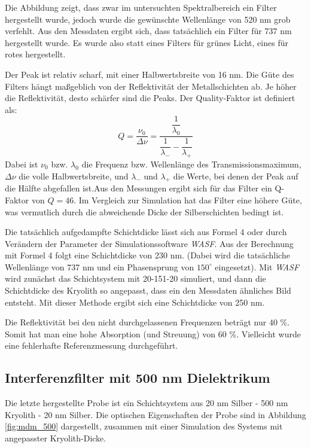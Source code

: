 \documentclass[10pt,twoside]{article}
\renewcommand{\1}{^{-1}}
\renewcommand{\2}{^{-2}}
\newcommand{\3}{^{-3}}
\newcommand{\4}{^{-4}}
\newcommand{\5}{^{-5}}
\newcommand{\6}{^{-6}}
\newcommand{\7}{^{-7}}
\newcommand{\8}{^{-8}}
\newcommand{\9}{^{-9}}
\begin{document}
\newpage

Die Abbildung zeigt, dass zwar im untersuchten Spektralbereich ein Filter hergestellt wurde, jedoch wurde die gewünschte Wellenlänge von 520 nm grob verfehlt. 
Aus den Messdaten ergibt sich, dass tatsächlich ein Filter für 737 nm hergestellt wurde. Es wurde also statt eines Filters für grünes Licht, eines für rotes hergestellt.

Der Peak ist relativ scharf, mit einer Halbwertsbreite von 16 nm. Die Güte des Filters hängt maßgeblich von der Reflektivität der Metallschichten ab. Je höher die Reflektivität, desto schärfer sind die Peaks.
Der Quality-Faktor ist definiert als:
\begin{equation}
Q=\frac{\nu_0}{\Delta \nu} = \dfrac{\dfrac{1}{\lambda_0}}{\dfrac{1}{\lambda_{-}}-\dfrac{1}{\lambda_{+}}}
\end{equation}
Dabei ist $\nu_0$ bzw. $\lambda_0$ die Frequenz bzw. Wellenlänge des Transmissionsmaximum, $\Delta \nu$ die volle Halbwertsbreite, und  $\lambda_{-}$ und $\lambda_{+}$ die Werte, bei denen der Peak auf die Hälfte abgefallen ist.Aus den Messungen ergibt sich für das Filter ein Q-Faktor von $Q=46$.
Im Vergleich zur Simulation hat das Filter eine höhere Güte, was vermutlich durch die abweichende Dicke der Silberschichten bedingt ist.

Die tatsächlich aufgedampfte Schichtdicke lässt sich aus Formel 4 oder durch Verändern der Parameter der Simulationssoftware \textit{WASF}.
Aus der Berechnung mit Formel 4 folgt eine Schichtdicke von 230 nm. (Dabei wird die tatsächliche Wellenlänge von 737 nm und ein Phasensprung von $150^\circ$ eingesetzt).
Mit \textit{WASF} wird zunächst das Schichtsystem mit 20-151-20 simuliert, und dann die Schichtdicke des Kryolith so angepasst, dass ein den Messdaten ähnliches Bild entsteht. Mit dieser Methode ergibt sich eine Schichtdicke von 250 nm.

Die Reflektivität bei den nicht durchgelassenen Frequenzen beträgt nur 40 \%. Somit hat man eine hohe Absorption (und Streuung) von 60 \%. Vielleicht wurde eine fehlerhafte Referenzmessung durchgeführt.


\subsection{Interferenzfilter mit 500 nm Dielektrikum}

Die letzte hergestellte Probe ist ein Schichtsystem aus 20 nm Silber - 500 nm Kryolith - 20 nm Silber.
Die optischen Eigenschaften der Probe sind in Abbildung \ref{fig:mdm_500} dargestellt, zusammen mit einer Simulation des Systems mit angepasster Kryolith-Dicke.
\end{document}
